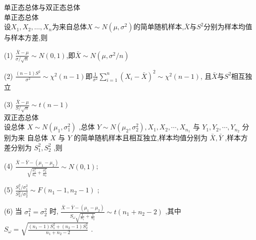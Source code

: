 \documentclass[12pt, a4paper, oneside, UTF8]{ctexbook}
\begin{document}
\begin{remark}
    单正态总体与双正态总体 \\
    单正态总体 \\
    设$X_1,X_2,\ldots,X_n$为来自总体$X\sim N(\mu,\sigma^2)$的简单随机样本,$\bar{X}$与$S^2$分别为样本均值与样本方差,则
    \item [(1)] $\frac{\bar{X}-\mu}{\sigma/\sqrt{n}}\sim N(0,1)$,即$\bar{X}\sim N(\mu,\sigma^2/n)$
    \item [(2)] $\frac{(n-1)S^2}{\sigma^2}\sim\chi^2(n-1)$即$\frac{1}{\sigma^2}\sum_{i=1}^{n}(X_i-\bar{X})^2\sim\chi^2(n-1)$,
    且$\bar{X}$与$S^2$相互独立 
    \item[(3)] $\frac{\bar{X}-\mu}{S/\sqrt{n}}\sim t(n-1)$ \\
    双正态总体 \\
    设总体 $X \sim  N\left( {{\mu }_{1},{\sigma }_{1}^{2}}\right)$ ,总体 $Y \sim  N\left( {{\mu }_{2},{\sigma }_{2}^{2}}\right) ,{X}_{1},{X}_{2},\cdots ,{X}_{{n}_{1}}$ 与 ${Y}_{1},{Y}_{2},\cdots ,{Y}_{{n}_{2}}$ 分别为来
    自总体 $X$ 与 $Y$ 的简单随机样本且相互独立,样本均值分别为 $\bar{X},\bar{Y}$ ,样本方差分别为 ${S}_{1}^{2},{S}_{2}^{2}$ ,则
    \item[(4)] $\frac{\bar{X} - \bar{Y} - \left( {{\mu }_{1} - {\mu }_{2}}\right) }{\sqrt{\frac{{\sigma }_{1}^{2}}{{n}_{1}} + \frac{{\sigma }_{2}^{2}}{{n}_{2}}}} \sim  N\left( {0,1}\right)$;
    \item[(5)]$\frac{S_1^2/{\sigma }_{1}^{2}}{{S}_{2}^{2}/\sigma_2^2} \sim  F\left( {{n}_{1} - 1,{n}_{2} - 1}\right)$ ;
    \item[(6)]当 ${\sigma }_{1}^{2} = {\sigma }_{2}^{2}$ 时, $\frac{\bar{X} - \bar{Y} - \left( {{\mu }_{1} - {\mu }_{2}}\right) }{{S}_{\omega }\sqrt{\frac{1}{{n}_{1}} + \frac{1}{{n}_{2}}}} \sim  t\left( {{n}_{1} + {n}_{2} - 2}\right)$ ,其中 ${S}_{\omega } = \sqrt{\frac{\left( {{n}_{1} - 1}\right) {S}_{1}^{2} + \left( {{n}_{2} - 1}\right) {S}_{2}^{2}}{{n}_{1} + {n}_{2} - 2}}$ .
\end{remark}
\end{document}
